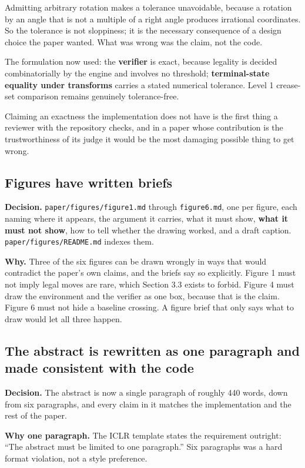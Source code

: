Admitting arbitrary rotation makes a tolerance unavoidable, because a rotation by an angle that is
not a multiple of a right angle produces irrational coordinates. So the tolerance is not
sloppiness; it is the necessary consequence of a design choice the paper wanted. What was wrong was
the claim, not the code.

The formulation now used: the \textbf{verifier} is exact, because legality is decided
combinatorially by the engine and involves no threshold; \textbf{terminal-state equality under
transforms} carries a stated numerical tolerance. Level 1 crease-set comparison remains genuinely
tolerance-free.

Claiming an exactness the implementation does not have is the first thing a reviewer with the
repository checks, and in a paper whose contribution is the trustworthiness of its judge it would
be the most damaging possible thing to get wrong.

\subsection{Figures have written briefs}

\textbf{Decision.} \texttt{paper/figures/figure1.md} through \texttt{figure6.md}, one per figure,
each naming where it appears, the argument it carries, what it must show, \textbf{what it must not
show}, how to tell whether the drawing worked, and a draft caption.
\texttt{paper/figures/README.md} indexes them.

\textbf{Why.} Three of the six figures can be drawn wrongly in ways that would contradict the
paper's own claims, and the briefs say so explicitly. Figure 1 must not imply legal moves are rare,
which Section 3.3 exists to forbid. Figure 4 must draw the environment and the verifier as one box,
because that is the claim. Figure 6 must not hide a baseline crossing. A figure brief that only says
what to draw would let all three happen.

\subsection{The abstract is rewritten as one paragraph and made consistent with the code}

\textbf{Decision.} The abstract is now a single paragraph of roughly 440 words, down from six
paragraphs, and every claim in it matches the implementation and the rest of the paper.

\textbf{Why one paragraph.} The ICLR template states the requirement outright: ``The abstract must
be limited to one paragraph.'' Six paragraphs was a hard format violation, not a style preference.

